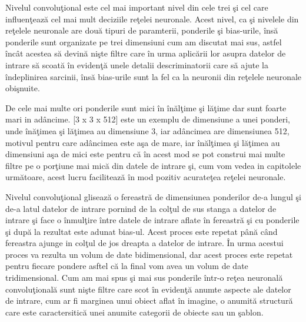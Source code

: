 Nivelul convolu\c{t}ional este cel mai important nivel din cele trei \c{s}i cel care influen\c{t}eaz\u{a} cel mai mult deciziile re\c{t}elei neuronale. Acest nivel, ca \c{s}i nivelele din re\c{t}elele neuronale are dou\u{a} tipuri de paramterii, ponderile \c{s}i bias-urile, \^{i}ns\u{a} ponderile sunt organizate pe trei dimensiuni cum am discutat mai sus, astfel \^{i}nc\^{a}t acestea s\u{a} devin\u{a} ni\c{s}te filtre care \^{i}n urma aplic\u{a}rii lor asupra datelor de intrare s\u{a} scoat\u{a} \^{i}n eviden\c{t}\u{a} unele detalii descriminatorii care s\u{a} ajute la \^{i}ndeplinirea sarcinii, \^{i}ns\u{a} bias-urile sunt la fel ca la neuronii din re\c{t}elele neuronale obi\c{s}nuite. 

\par

De cele mai multe ori ponderile sunt mici \^{i}n \^{i}n\u{a}l\c{t}ime \c{s}i l\u{a}\c{t}ime dar sunt foarte mari in ad\^{a}ncime. [3 x 3 x 512] este un exemplu de dimensiune a unei ponderi, unde \^{i}n\u{a}\c{t}imea \c{s}i l\u{a}\c{t}imea au dimensiune 3, iar ad\^{a}ncimea are dimensiunea 512, motivul pentru care ad\^{a}ncimea este a\c{s}a de mare, iar \^{i}n\u{a}l\c{t}imea \c{s}i l\u{a}\c{t}imea au dimensiuni a\c{s}a de mici  este pentru c\u{a} \^{i}n acest mod se pot construi mai multe filtre pe o por\c{t}iune mai mic\u{a} din datele de intrare \c{s}i, cum vom vedea in capitolele urm\u{a}toare, acest lucru faciliteaz\u{a} \^{i}n mod pozitiv acurate\c{t}ea re\c{t}elei neuronale.

\par

Nivelul convolu\c{t}ional gliseaz\u{a} o fereastr\u{a} de dimensiunea ponderilor de-a lungul \c{s}i de-a latul datelor de intrare pornind de la col\c{t}ul de sus stanga a datelor de intrare \c{s}i face o \^{i}nmul\c{t}ire \^{i}ntre  datele de intrare aflate \^{i}n fereastr\u{a} \c{s}i cu ponderile \c{s}i  dup\u{a} la rezultat este adunat bias-ul. Acest proces este repetat p\^{a}n\u{a} c\^{a}nd fereastra ajunge in col\c{t}ul de jos dreapta a datelor de intrare. \^{I}n urma acestui proces va rezulta un volum de date bidimensional, dar acest proces este repetat pentru fiecare pondere asftel c\u{a} la final vom avea un volum de date tridimensional. Cum am mai spus \c{s}i mai sus ponderile \^{i}ntr-o re\c{t}ea neuronal\u{a} convolu\c{t}ional\u{a} sunt ni\c{s}te filtre care scot \^{i}n eviden\c{t}\u{a} anumte aspecte ale datelor de intrare, cum ar fi marginea unui obiect aflat \^{i}n imagine, o anumit\u{a} structur\u{a} care este caractersitic\u{a} unei anumite categorii de obiecte sau un \c{s}ablon.

